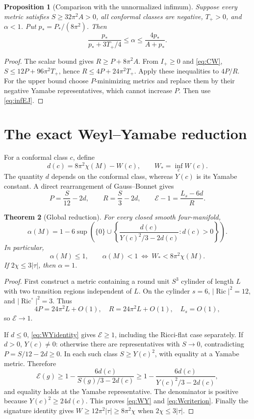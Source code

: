 \documentclass[11pt,a4paper]{article}
\newtheorem{theorem}{Theorem}[section]
\newtheorem{proposition}[theorem]{Proposition}
\theoremstyle{definition}\newtheorem{definition}[theorem]{Definition}
\theoremstyle{remark}\newtheorem{remark}[theorem]{Remark}
\newcommand{\Ric}{\operatorname{Ric}}
\newcommand{\E}{\mathcal E}
\begin{document}
\begin{proposition}[Comparison with the unnormalized infimum]\label{prop:comparison}
Suppose every metric satisfies $S\ge32\pi^2A>0$, all conformal classes are negative, $T_+>0$, and $\alpha<1$. Put $p_*=P_*/(8\pi^2)$. Then
\begin{equation}\label{eq:comparison}
 \frac{p_*}{p_*+3T_+/4}\le\alpha\le\frac{4p_*}{A+p_*}.
\end{equation}
\end{proposition}
\begin{proof}
The scalar bound gives $R\ge P+8\pi^2A$. From $I_+\ge0$ and \eqref{eq:CW}, $S\le12P+96\pi^2T_+$, hence $R\le4P+24\pi^2T_+$. Apply these inequalities to $4P/R$. For the upper bound choose $P$-minimizing metrics and replace them by their negative Yamabe representatives, which cannot increase $P$. Then use \eqref{eq:infEJ}.
\end{proof}

\section{The exact Weyl--Yamabe reduction}
For a conformal class $c$, define
\[
 d(c)=8\pi^2\chi(M)-W(c),\qquad W_* =\inf_c W(c).
\]
The quantity $d$ depends on the conformal class, whereas $Y(c)$ is its Yamabe constant. A direct rearrangement of Gauss--Bonnet gives
\begin{equation}\label{eq:WYidentity}
 P=\frac S{12}-2d,\qquad R=\frac S3-2d,\qquad
 \E-1=\frac{L_s-6d}{R}.
\end{equation}

\begin{theorem}[Global reduction]\label{thm:WY}
For every closed smooth four-manifold,
\begin{equation}\label{eq:WY}
 \alpha(M)=1-6\sup\left(\{0\}\cup
 \left\{\frac{d(c)}{Y(c)^2/3-2d(c)}:d(c)>0\right\}\right).
\end{equation}
In particular,
\begin{equation}\label{eq:Wcriterion}
 \alpha(M)\le1,\qquad
 \alpha(M)<1\ \Longleftrightarrow\ W_*<8\pi^2\chi(M).
\end{equation}
If $2\chi\le3|\tau|$, then $\alpha=1$.
\end{theorem}
\begin{proof}
First construct a metric containing a round unit $S^3$ cylinder of length $L$ with two transition regions independent of $L$. On the cylinder $s=6$, $|\Ric|^2=12$, and $|\Ric^\circ|^2=3$. Thus
\[
 4P=24\pi^2L+O(1),\quad R=24\pi^2L+O(1),\quad L_s=O(1),
\]
so $\E\to1$.

If $d\le0$, \eqref{eq:WYidentity} gives $\E\ge1$, including the Ricci-flat case separately. If $d>0$, $Y(c)\ne0$: otherwise there are representatives with $S\to0$, contradicting $P=S/12-2d\ge0$. In each such class $S\ge Y(c)^2$, with equality at a Yamabe metric. Therefore
\[
 \E(g)\ge1-\frac{6d(c)}{S(g)/3-2d(c)}
 \ge1-\frac{6d(c)}{Y(c)^2/3-2d(c)},
\]
and equality holds at the Yamabe representative. The denominator is positive because $Y(c)^2\ge24d(c)$. This proves \eqref{eq:WY} and \eqref{eq:Wcriterion}. Finally the signature identity gives $W\ge12\pi^2|\tau|\ge8\pi^2\chi$ when $2\chi\le3|\tau|$.
\end{proof}
\end{document}
